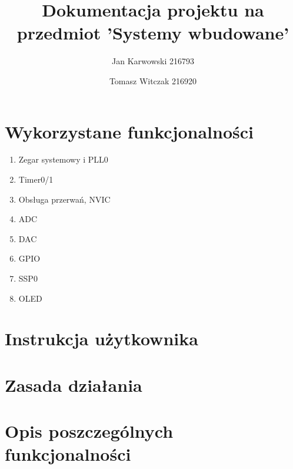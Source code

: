 \documentclass{article}
\author{
    Jan Karwowski 216793
        \and
    Tomasz Witczak 216920
}
\title{Dokumentacja projektu na przedmiot 'Systemy wbudowane'}
\begin{document}
\maketitle
\newpage

\section{Wykorzystane funkcjonalności}
\begin{enumerate}
    \item Zegar systemowy i PLL0
    \item Timer0/1
    \item Obsługa przerwań, NVIC
    \item ADC
    \item DAC
    \item GPIO
    \item SSP0
    \item OLED
\end{enumerate}

\section{Instrukcja użytkownika}
 \label{instrukcja_uzytkownika}

\section{Zasada działania}
 \label{zasada_dzialania}

\section{Opis poszczególnych funkcjonalności}
 \label{system_clock}
 \label{timer}
 \label{interrupts}
 \label{adc}
 \label{dac}
 \label{gpio}
 \label{ssp}
 \label{oled}
\end{document}
